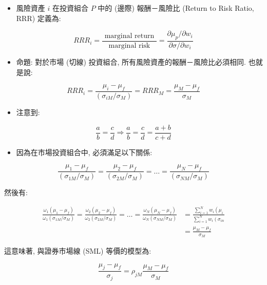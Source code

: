 \documentclass[letterpaper]{article}
\begin{document}
\begin{itemize}
	\item 風險資產 $i$ 在投資組合 $P$ 中的 (邊際) 報酬－風險比 (Return to Risk Ratio, RRR) 定義為: 
\end{itemize}

$$
R R R_{i}=\frac{\text { marginal return }}{\text { marginal risk }}=\frac{\partial \mu_{p} / \partial w_{i}}{\partial \sigma / \partial w_{i}}
$$


\begin{itemize}
	\item 命題: 對於市場 (切線) 投資組合, 所有風險資產的報酬－風險比必須相同. 也就是說: 
\end{itemize}


$$
R R R_{i}=\frac{\mu_{i}-\mu_{f}}{\left (\sigma_{i M} / \sigma_{M}\right) }=R R R_{M}=\frac{\mu_{M}-\mu_{f}}{\sigma_{M}}
$$

\begin{itemize}
  \item 注意到: 
\end{itemize}

$$
\frac{a}{b}=\frac{c}{d} \Longrightarrow \frac{a}{b}=\frac{c}{d}=\frac{a+b}{c+d}
$$

\begin{itemize}
	\item 因為在市場投資組合中, 必須滿足以下關係: 
\end{itemize}

$$
\frac{\mu_{1}-\mu_{f}}{\left (\sigma_{1 M} / \sigma_{M}\right) }=\frac{\mu_{2}-\mu_{f}}{\left (\sigma_{2 M} / \sigma_{M}\right) }=\ldots=\frac{\mu_{N}-\mu_{f}}{\left (\sigma_{N M} / \sigma_{M}\right) }
$$

然後有: 

$$
\begin{aligned}
\frac{\omega_{1}\left (\mu_{1}-\mu_{f}\right) }{\omega_{1}\left (\sigma_{1 M} / \sigma_{M}\right) }=\frac{\omega_{2}\left (\mu_{2}-\mu_{f}\right) }{\omega_{2}\left (\sigma_{2 M} / \sigma_{M}\right) }=\ldots=\frac{\omega_{N}\left (\mu_{N}-\mu_{f}\right) }{\omega_{N}\left (\sigma_{N M} / \sigma_{M}\right) } & =\frac{\sum_{i=1}^{N} w_{i}\left (\mu_{i}\right.}{\sum_{i=1}^{N} w_{i}\left (\sigma_{i n}\right.} \\
& =\frac{\mu_{M}-\mu_{f}}{\sigma_{M}}
\end{aligned}
$$

這意味著, 與證券市場線 (SML) 等價的模型為: 

$$
\frac{\mu_{j}-\mu_{f}}{\sigma_{j}}=\rho_{j M} \frac{\mu_{M}-\mu_{f}}{\sigma_{M}}
$$
\end{document}
